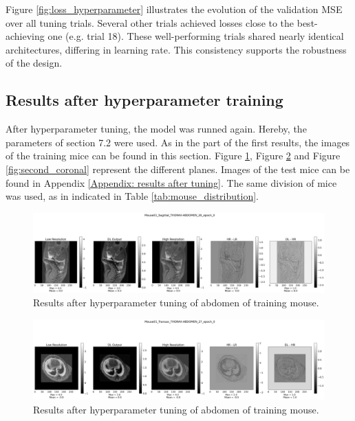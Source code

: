 \documentclass[twocolumn]{article}
\begin{document}
Figure \ref{fig:loss_hyperparameter} illustrates the evolution of the validation MSE over all tuning trials.
Several other trials achieved losses close to the best-achieving one (e.g. trial 18).
These well-performing trials shared nearly identical architectures, differing in learning rate. 
This consistency supports the robustness of the design. 



\subsection{Results after hyperparameter training}
After hyperparameter tuning, the model was runned again. Hereby, the parameters of section 7.2 were used.
As in the part of the first results, the images of the training mice can be found in this section.
Figure \ref{fig:second_sagittal}, Figure \ref{fig:second_transax} and Figure \ref{fig:second_coronal} represent the different planes.
Images of the test mice can be found in Appendix \ref{Appendix: results after tuning}.
The same division of mice was used, as in indicated in Table \ref{tab:mouse_distribution}.

\begin{figure}
    \centering
    \includegraphics[width=1\linewidth]{Mouse01_Sagittal_THORAX-ABDOMEN_26_epoch_0.png}
    \caption{Results after hyperparameter tuning of abdomen of training mouse.}
    \label{fig:second_sagittal}
\end{figure}

\begin{figure}
    \centering
    \includegraphics[width=1\linewidth]{Mouse01_Transax_THORAX-ABDOMEN_27_epoch_0.png}
    \caption{Results after hyperparameter tuning of abdomen of training mouse.}
    \label{fig:second_transax}
\end{figure}
\end{document}
